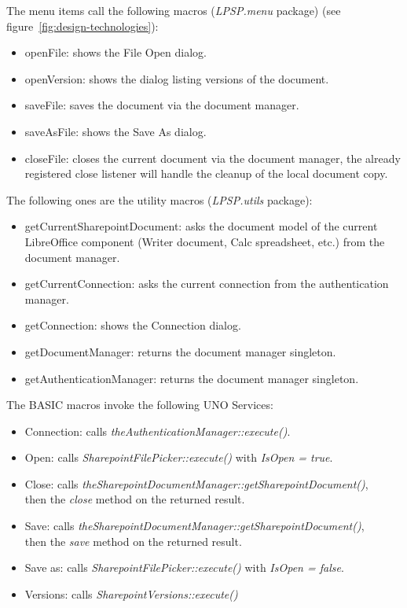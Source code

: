 The menu items call the following macros (\emph{LPSP.menu} package) (see figure~\ref{fig:design-technologies}):

\begin{itemize}
\item openFile: shows the File Open dialog.
\item openVersion: shows the dialog listing versions of the document.
\item saveFile: saves the document via the document manager.
\item saveAsFile: shows the Save As dialog.
\item closeFile: closes the current document via the document manager, the
already registered close listener will handle the cleanup of the local document
copy.
\end{itemize}

The following ones are the utility macros (\emph{LPSP.utils} package):

\begin{itemize}
\item getCurrentSharepointDocument: asks the document model of the current LibreOffice component (Writer document, Calc spreadsheet, etc.) from the document manager.
\item getCurrentConnection: asks the current connection from the authentication manager.
\item getConnection: shows the Connection dialog.
\item getDocumentManager: returns the document manager singleton.
\item getAuthenticationManager: returns the document manager singleton.
\end{itemize}

The BASIC macros invoke the following UNO Services:

\begin{itemize}
\item Connection: calls \emph{theAuthenticationManager::execute()}.
\item Open: calls \emph{SharepointFilePicker::execute()} with \emph{IsOpen = true}.
\item Close: calls \emph{theSharepointDocumentManager::getSharepointDocument()}, \\ then the \emph{close} method on the returned result.
\item Save: calls \emph{theSharepointDocumentManager::getSharepointDocument()}, \\ then the \emph{save} method on the returned result.
\item Save as: calls \emph{SharepointFilePicker::execute()} with \emph{IsOpen = false}.
\item Versions: calls \emph{SharepointVersions::execute()}
\end{itemize}

